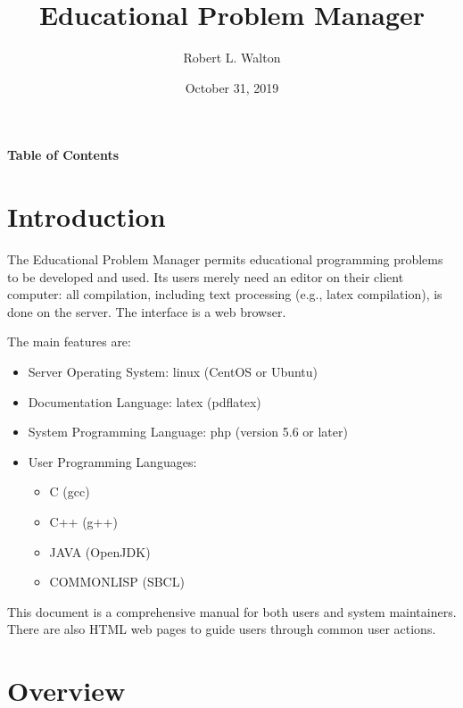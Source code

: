 \documentclass[12pt]{article}
\makeatletter
\renewcommand\tableofcontents{%
    \begin{list}{}%
	     {\setlength{\itemsep}{0in}%
	      \setlength{\topsep}{0in}%
	      \setlength{\parsep}{1ex}%
	      \setlength{\labelwidth}{0in}%
	      \setlength{\baselineskip}{1.5ex}%
	      \setlength{\leftmargin}{0.8in}%
	      \setlength{\rightmargin}{0.8in}}%
    \item\@starttoc{toc}%
    \end{list}}
\makeatother
\begin{document}
        
\title{Educational Problem Manager}

\author{Robert L. Walton}

\date{October 31, 2019}
 
\maketitle

\newpage
\begin{center}
\large \bf Table of Contents
\end{center}

\bigskip

\tableofcontents 

\newpage

\section{Introduction}

The Educational Problem Manager permits educational programming
problems to be developed and used.  Its users merely need an
editor on their client computer: all compilation, including
text processing (e.g., latex compilation), is done on the
server.  The interface is a web browser.

The main features are:

\begin{itemize}
\item Server Operating System: linux (CentOS or Ubuntu)
\item Documentation Language: latex (pdflatex)
\item System Programming Language: php (version 5.6 or later)
\item User Programming Languages:
\begin{itemize}
\item C (gcc)
\item C++ (g++)
\item JAVA (OpenJDK)
\item COMMONLISP (SBCL)
\end{itemize}

\end{itemize}

This document is a comprehensive manual for both users and
system maintainers.  There are also HTML web pages to guide
users through common user actions.

\section{Overview}
\end{document}
